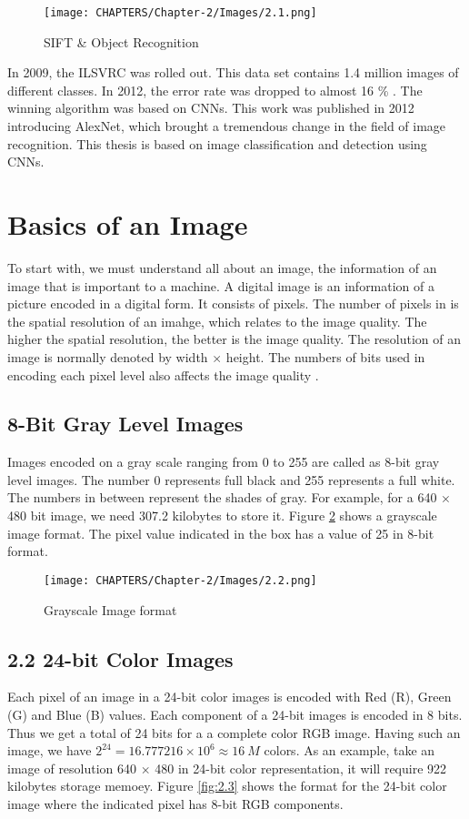\begin{figure}[t]
	\centering
	\texttt{[image: CHAPTERS/Chapter-2/Images/2.1.png]}
	\caption{SIFT \& Object Recognition}
	\label{fig:2.1}
\end{figure}
In 2009, the ILSVRC was 
rolled out. This data set contains 1.4 million images of different classes. In 2012, the 
error rate was dropped to almost 16 \% \cite{chap_2_article:5}. The winning algorithm was based on 
CNNs. This work was published in 2012 introducing AlexNet, which brought a tremendous change in the field of image recognition. This thesis is based on image 
classification and detection using CNNs. 

\section{Basics of an Image}
To start with, we must understand all about an image, the information of 
an image that is important to a machine. A digital image is an information of a picture 
encoded in a digital form. It consists of pixels. The number of pixels 
in is the spatial resolution of an imahge, which 
relates to the image quality. The higher the spatial resolution, the better 
is the image quality. The resolution of an image is normally denoted by width $\times$ height. 
The numbers of bits used in encoding each pixel level also affects the image quality \cite{chap_2_article:6,chap_2_article:7}. 

\subsection{8-Bit Gray Level Images}
Images encoded on a gray scale ranging from 0 to 255 are called as
8-bit gray level images. The number 0 represents full black
and 255 represents a full white. The numbers in between 
represent the shades of gray. For example, for a 640 $\times$ 480 bit 
image, we need 307.2 kilobytes to store it. Figure \ref{fig:2.2} shows a 
grayscale image format. The pixel value indicated 
in the box has a value of 25 in 8-bit format. 

\begin{figure}[H]
	\centering
	\texttt{[image: CHAPTERS/Chapter-2/Images/2.2.png]}
	\caption{Grayscale Image format}
	\label{fig:2.2}
\end{figure}

\subsection{2.2	24-bit Color Images}
Each pixel of an image in a 24-bit color images is 
encoded with Red (R), Green (G) and Blue (B) values. Each component of a 24-bit
images is encoded in 8 bits. Thus we get a total of 24 bits for a
a complete color RGB image. Having 
such an image, we have $2^{24} = 16.777216 \times 10^{6} \approx 16\:M$ colors.
As an example, take an image of resolution 640 $\times$ 480 in 24-bit color 
representation, it will require 922 kilobytes storage memoey.
Figure \ref{fig:2.3} shows the format for the 24-bit 
color image where the indicated pixel has 8-bit RGB components.

